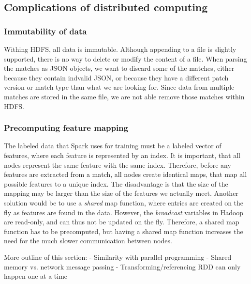 \subsection{Complications of distributed computing}

\subsubsection{Immutability of data}
Withing HDFS, all data is immutable. Although appending to a file is slightly supported, there is no way to delete or modify the content of a file.
When parsing the matches as JSON objects, we want to discard some of the matches, either because they contain indvalid JSON, or because they have a different patch version or match type than what we are looking for. Since data from multiple matches are stored in the same file, we are not able remove those matches within HDFS.

\subsubsection{Precomputing feature mapping}
The labeled data that Spark uses for training must be a labeled vector of features, where each feature is represented by an index.
It is important, that all nodes represent the same feature with the same index. Therefore, before any features are extracted from a match, all nodes create identical maps, that map all possible features to a unique index. The disadvantage is that the size of the mapping may be larger than the size of the features we actually meet.
Another solution would be to use a \textit{shared} map function, where entries are created on the fly as features are found in the data.
However, the \textit{broadcast} variables in Hadoop are read-only, and can thus not be updated on the fly.
Therefore, a shared map function has to be precomputed, but having a shared map function increases the need for the much slower communication between nodes.

More outline of this section:
- Similarity with parallel programming
    - Shared memory vs. network message passing
- Transforming/referencing RDD can only happen one at a time
